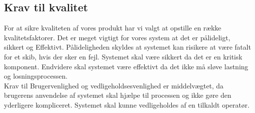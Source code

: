 \subsection{Krav til kvalitet}
For at sikre kvaliteten af vores produkt har vi valgt at opstille en række kvalitetsfaktorer. Det er meget vigtigt for vores system at det er pålideligt, sikkert og Effektivt. Pålideligheden skyldes at systemet kan risikere at være fatalt for et skib, hvis der sker en fejl. Systemet skal være sikkert da det er en kritisk komponent. Endvidere skal systemet være effektivt da det ikke må sløve lastning og losningsprocessen.\\
Krav til Brugervenlighed og vedligeholdsesvenlighed er middelvægtet, da brugerens anvendelse af systemet skal hjælpe til processen og ikke gøre den yderligere kompliceret. Systemet skal kunne vedligeholdes af en tilkaldt operatør.\\
